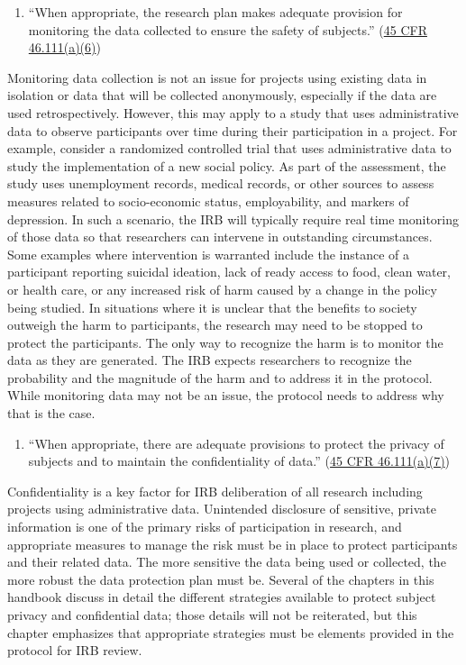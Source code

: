 \documentclass[
]{WileySix}
\providecommand{\tightlist}{%
  \setlength{\itemsep}{0pt}\setlength{\parskip}{0pt}}
\begin{document}
\begin{enumerate}
\def\labelenumi{(\arabic{enumi})}
\setcounter{enumi}{5}
\tightlist
\item
  ``When appropriate, the research plan makes adequate provision for monitoring the data collected to ensure the safety of subjects.'' (\href{https://www.law.cornell.edu/cfr/text/45/46.111}{45 CFR 46.111(a)(6)})
\end{enumerate}

Monitoring data collection is not an issue for projects using existing data in isolation or data that will be collected anonymously, especially if the data are used retrospectively. However, this may apply to a study that uses administrative data to observe participants over time during their participation in a project. For example, consider a randomized controlled trial that uses administrative data to study the implementation of a new social policy. As part of the assessment, the study uses unemployment records, medical records, or other sources to assess measures related to socio-economic status, employability, and markers of depression. In such a scenario, the IRB will typically require real time monitoring of those data so that researchers can intervene in outstanding circumstances. Some examples where intervention is warranted include the instance of a participant reporting suicidal ideation, lack of ready access to food, clean water, or health care, or any increased risk of harm caused by a change in the policy being studied. In situations where it is unclear that the benefits to society outweigh the harm to participants, the research may need to be stopped to protect the participants. The only way to recognize the harm is to monitor the data as they are generated. The IRB expects researchers to recognize the probability and the magnitude of the harm and to address it in the protocol. While monitoring data may not be an issue, the protocol needs to address why that is the case.

\begin{enumerate}
\def\labelenumi{(\arabic{enumi})}
\setcounter{enumi}{6}
\tightlist
\item
  ``When appropriate, there are adequate provisions to protect the privacy of subjects and to maintain the confidentiality of data.'' (\href{https://www.law.cornell.edu/cfr/text/45/46.111}{45 CFR 46.111(a)(7)})
\end{enumerate}

Confidentiality is a key factor for IRB deliberation of all research including projects using administrative data. Unintended disclosure of sensitive, private information is one of the primary risks of participation in research, and appropriate measures to manage the risk must be in place to protect participants and their related data. The more sensitive the data being used or collected, the more robust the data protection plan must be. Several of the chapters in this handbook discuss in detail the different strategies available to protect subject privacy and confidential data; those details will not be reiterated, but this chapter emphasizes that appropriate strategies must be elements provided in the protocol for IRB review.
\end{document}
